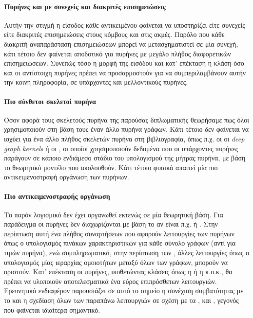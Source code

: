 \paragraph*{Πυρήνες και με συνεχείς και διακριτές επισημειώσεις}
Αυτήν την στιγμή η είσοδος κάθε αντικειμένου φαίνεται να υποστηρίζει είτε συνεχείς είτε διακριτές επισημειώσεις στους κόμβους και στις ακμές.
Παρόλο που κάθε διακριτή αναπαράσταση επισημειώσεων μπορεί να μετασχηματιστεί σε μία συνεχή, κάτι τέτοιο δεν φαίνεται αποδοτικό για πυρήνες με μεγάλο πλήθος διαφορετικών επισημειώσεων.
Συνεπώς τόσο η μορφή της εισόδου και κατ' επέκταση η κλάση  όσο και οι αντίστοιχη πυρήνες πρέπει να προσαρμοστούν για να συμπεριλαμβάνουν αυτήν την κοινή πληροφορία, σε υπάρχοντες και μελλοντικούς πυρήνες.
\paragraph*{Πιο σύνθετοι σκελετοί πυρήνα}
Όσον αφορά τους σκελετούς πυρήνα της παρούσας διπλωματικής θεωρήσαμε πως όλοι χρησιμοποιούν στη βάση τους έναν άλλο πυρήνα γράφων.
Κάτι τέτοιο δεν φαίνεται να ισχύει για ένα άλλο πλήθος σκελετών πυρήνα στη βιβλιογραφία, όπως π.χ. οι οι \textit{deep graph kernels} \cite{DGK_PINAR} ή οι  \cite{kriege_2016_otk}, οι οποίοι χρησιμοποιούν δεδομένα που οι υπάρχοντες πυρήνες παράγουν σε κάποιο ενδιάμεσο στάδιο του υπολογισμού της μήτρας πυρήνα, με βάση το θεωρητικό μοντέλο που ακολουθούν.
Κάτι τέτοιο φυσικά απαιτεί μία πιο αντικειμενοστραφή οργάνωση των πυρήνων.
\paragraph*{Πιο αντικειμενοστραφής οργάνωση}
Το παρόν λογισμικό δεν έχει οργανωθεί εκτενώς σε μία θεωρητική βάση.
Για παράδειγμα οι πυρήνες δεν διαχωρίζονται με βάση το αν είναι π.χ.  \cite{vishwanathan2010graph} ή  \cite{Frohlich2005}.
Στην περίπτωση αυτή ένα πλήθος συναρτήσεων που αφορούν λειτουργίες των  πυρήνων όπως ο υπολογισμός πινάκων χαρακτηριστικών για κάθε σύνολο γράφων (αντί για τιμών πυρήνα), ενώ συμπληρωματικά, στην περίπτωση των , άλλες λειτουργίες όπως ο υπολογισμός μίας ιεραρχίας ομοιοτήτων μεταξύ όλων των γράφων, μπορούν να οριστούν.
Κατ' επέκταση οι πυρήνες, υιοθετώντας κλάσεις όπως η  ή η  κ.ο.κ., θα πρέπει να υλοποιούν αποτελεσματικά ένα εύρος επιπρόσθετων λειτουργιών.
Ερευνητικό ενδιαφέρον παρουσιάζει σε αυτό το σημείο η συνέχιση συμβατότητας με το  και η σχεδίαση όλων των παραπάνω λειτουργιών σε σχέση με τα ,  και , γεγονός που φαίνεται ιδιαίτερα σημαντικό.
